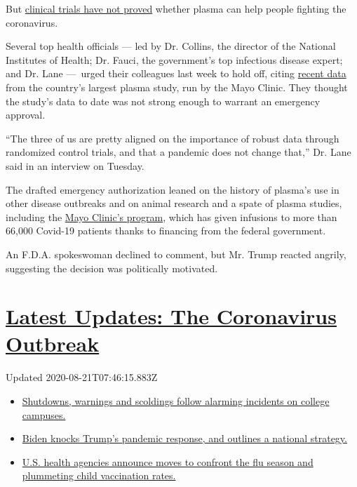 But
\href{https://www.nytimes3xbfgragh.onion/2020/08/04/health/trump-plasma.html}{clinical
trials have not proved} whether plasma can help people fighting the
coronavirus.

Several top health officials --- led by Dr. Collins, the director of the
National Institutes of Health; Dr. Fauci, the government's top
infectious disease expert; and Dr. Lane ---~urged their colleagues last
week to hold off, citing
\href{https://www.medrxiv.org/content/10.1101/2020.08.12.20169359v1}{recent
data} from the country's largest plasma study, run by the Mayo Clinic.
They thought the study's data to date was not strong enough to warrant
an emergency approval.

``The three of us are pretty aligned on the importance of robust data
through randomized control trials, and that a pandemic does not change
that,'' Dr. Lane said in an interview on Tuesday.

The drafted emergency authorization leaned on the history of plasma's
use in other disease outbreaks and on animal research and a spate of
plasma studies, including the \href{https://www.uscovidplasma.org/}{Mayo
Clinic's program}, which has given infusions to more than 66,000
Covid-19 patients thanks to financing from the federal government.

An F.D.A. spokeswoman declined to comment, but Mr. Trump reacted
angrily, suggesting the decision was politically motivated.

\hypertarget{latest-updates-the-coronavirus-outbreak}{%
\section{\texorpdfstring{\href{https://www.nytimes3xbfgragh.onion/2020/08/20/world/coronavirus-covid.html?action=click\&pgtype=Article\&state=default\&region=MAIN_CONTENT_1\&context=storylines_live_updates}{Latest
Updates: The Coronavirus
Outbreak}}{Latest Updates: The Coronavirus Outbreak}}\label{latest-updates-the-coronavirus-outbreak}}

Updated 2020-08-21T07:46:15.883Z

\begin{itemize}
\tightlist
\item
  \href{https://www.nytimes3xbfgragh.onion/2020/08/20/world/coronavirus-covid.html?action=click\&pgtype=Article\&state=default\&region=MAIN_CONTENT_1\&context=storylines_live_updates\#link-68774d88}{Shutdowns,
  warnings and scoldings follow alarming incidents on college campuses.}
\item
  \href{https://www.nytimes3xbfgragh.onion/2020/08/20/world/coronavirus-covid.html?action=click\&pgtype=Article\&state=default\&region=MAIN_CONTENT_1\&context=storylines_live_updates\#link-26b58724}{Biden
  knocks Trump's pandemic response, and outlines a national strategy.}
\item
  \href{https://www.nytimes3xbfgragh.onion/2020/08/20/world/coronavirus-covid.html?action=click\&pgtype=Article\&state=default\&region=MAIN_CONTENT_1\&context=storylines_live_updates\#link-4e542da3}{U.S.
  health agencies announce moves to confront the flu season and
  plummeting child vaccination rates.}
\end{itemize}

